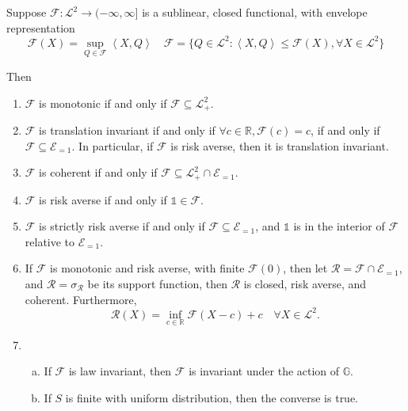 \begin{prop}
\label{prop:envelop_rep}
Suppose \( \mathcal{F} : \mathscr{L}^2 \to (-\infty , \infty ] \) is a sublinear, closed functional, with envelope representation 
\[\mathcal{F}(X ) = \sup_{Q \in \mathscr{F}} \left<X, Q \right> \quad \mathscr{F} = \{Q \in \mathscr{L}^2 : \left<X, Q \right>\le \mathcal{F}(X), \forall X \in \mathscr{L}^2 \}  \]

Then
\begin{enumerate}[(1)]
	\item \(\mathcal{F}\) is monotonic if and only if \(\mathscr{F}\subseteq \mathscr{L}^2_+\).
	\item \(\mathcal{F}\) is translation invariant if and only if \(\forall c\in \mathbb{R}, \mathcal{F}(c) = c\), if and only if \(\mathscr{F}\subseteq \mathscr{E}_{=1}\). In particular, if \(\mathcal{F}\) is risk averse, then it is translation invariant.
	\item $\mathcal{F}$ is coherent if and only if $\mathscr{F}\subseteq \mathscr{L}_+^2\cap \mathscr{E}_{=1}$.
	\item  \(\mathcal{F}\) is risk averse if and only if \(\mathds{1}\in \mathscr{F}\).
	\item  \(\mathcal{F}\) is strictly risk averse if and only if $\mathscr{F}\subseteq \mathscr{E}_{=1}$, and \(\mathds{1}\) is in the interior of \(\mathscr{F}\) relative to \(\mathscr{E}_{=1}\). 
	\item If \(\mathcal{F}\) is monotonic and risk averse, with finite $\mathcal{F}(0)$, then let \(\mathscr{R} = \mathscr{F}\cap \mathscr{E}_{=1}\), and \(\mathcal{R} = \sigma_{\mathscr{R}}\) be its support function, then \(\mathcal{R}\) is closed, risk averse, and coherent. Furthermore, 
	\[\mathcal{R}(X ) = \inf_{c\in \mathbb{R}} \mathcal{F}(X - c) + c \quad \forall X \in \mathscr{L}^2.\]
	\item 
	\begin{enumerate}[(a)]
		\item 	If \(\mathcal{F}\) is law invariant, then \(\mathscr{F} \) is invariant under the action of \(\mathbb{G}\).
		
		\item If \(S\) is finite with uniform distribution, then the converse is true.
	\end{enumerate}
\end{enumerate}
\end{prop}

